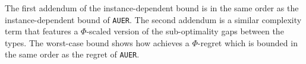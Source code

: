 The first addendum of the instance-dependent bound is in the same order as the instance-dependent bound of \texttt{AUER}. The second addendum is a  similar complexity term that features a $\Phi$-scaled version of the sub-optimality gaps between the types. The worst-case bound shows how \algedflearn achieves a $\Phi$-regret which is bounded in the same order as the regret of \texttt{AUER}.


